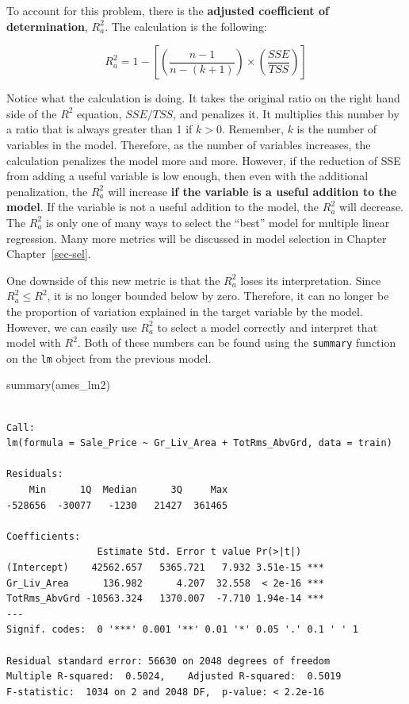 \documentclass[
  letterpaper,
  DIV=11,
  numbers=noendperiod]{scrreprt}
\newenvironment{Shaded}{\begin{snugshade}}{\end{snugshade}}
\newcommand{\FunctionTok}[1]{\textcolor[rgb]{0.28,0.35,0.67}{#1}}
\newcommand{\NormalTok}[1]{\textcolor[rgb]{0.00,0.23,0.31}{#1}}
\begin{document}
To account for this problem, there is the \textbf{adjusted coefficient
of determination}, \(R^2_a\). The calculation is the following:

\[
R^2_a = 1 - [(\frac{n-1}{n-(k+1)})\times (\frac{SSE}{TSS})]
\]

Notice what the calculation is doing. It takes the original ratio on the
right hand side of the \(R^2\) equation, \(SSE/TSS\), and penalizes it.
It multiplies this number by a ratio that is always greater than 1 if
\(k > 0\). Remember, \(k\) is the number of variables in the model.
Therefore, as the number of variables increases, the calculation
penalizes the model more and more. However, if the reduction of SSE from
adding a useful variable is low enough, then even with the additional
penalization, the \(R^2_a\) will increase \textbf{if the variable is a
useful addition to the model}. If the variable is not a useful addition
to the model, the \(R^2_a\) will decrease. The \(R^2_a\) is only one of
many ways to select the ``best'' model for multiple linear regression.
Many more metrics will be discussed in model selection in Chapter
Chapter~\ref{sec-sel}.

One downside of this new metric is that the \(R^2_a\) loses its
interpretation. Since \(R^2_a \le R^2\), it is no longer bounded below
by zero. Therefore, it can no longer be the proportion of variation
explained in the target variable by the model. However, we can easily
use \(R^2_a\) to select a model correctly and interpret that model with
\(R^2\). Both of these numbers can be found using the \texttt{summary}
function on the \texttt{lm} object from the previous model.

\begin{Shaded}
\begin{Highlighting}[]
\FunctionTok{summary}\NormalTok{(ames\_lm2)}
\end{Highlighting}
\end{Shaded}

\begin{verbatim}

Call:
lm(formula = Sale_Price ~ Gr_Liv_Area + TotRms_AbvGrd, data = train)

Residuals:
    Min      1Q  Median      3Q     Max 
-528656  -30077   -1230   21427  361465 

Coefficients:
                Estimate Std. Error t value Pr(>|t|)    
(Intercept)    42562.657   5365.721   7.932 3.51e-15 ***
Gr_Liv_Area      136.982      4.207  32.558  < 2e-16 ***
TotRms_AbvGrd -10563.324   1370.007  -7.710 1.94e-14 ***
---
Signif. codes:  0 '***' 0.001 '**' 0.01 '*' 0.05 '.' 0.1 ' ' 1

Residual standard error: 56630 on 2048 degrees of freedom
Multiple R-squared:  0.5024,    Adjusted R-squared:  0.5019 
F-statistic:  1034 on 2 and 2048 DF,  p-value: < 2.2e-16
\end{verbatim}
\end{document}
